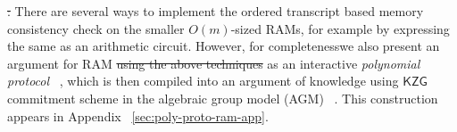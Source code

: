 \documentclass[sigconf]{acmart}
\newcommand{\kzg}{\ensuremath{\mathsf{KZG}}}
\newcommand{\moumita}[1]{\textcolor{orange}{M: #1}}
\providecommand{\DIFaddtex}[1]{{\protect\color{blue}\uwave{#1}}} %
\providecommand{\DIFdeltex}[1]{{\protect\color{red}\sout{#1}}}                      %
\providecommand{\DIFaddbegin}{} %
\providecommand{\DIFaddend}{} %
\providecommand{\DIFdelbegin}{} %
\providecommand{\DIFdelend}{} %
\providecommand{\DIFadd}[1]{\texorpdfstring{\DIFaddtex{#1}}{#1}} %
\providecommand{\DIFdel}[1]{\texorpdfstring{\DIFdeltex{#1}}{}} %
\newcommand{\DIFscaledelfig}{0.5}
\newlength{\DIFdelgraphicswidth} %
\newlength{\DIFdelgraphicsheight} %
\newcommand{\DIFaddincludegraphics}[2][]{{\color{blue}\fbox{\DIFOincludegraphics[#1]{#2}}}} %
\newcommand{\DIFdelincludegraphics}[2][]{%
	\sbox{\DIFdelgraphicsbox}{\DIFOincludegraphics[#1]{#2}}%
	\settoboxwidth{\DIFdelgraphicswidth}{\DIFdelgraphicsbox} %
	\settoboxtotalheight{\DIFdelgraphicsheight}{\DIFdelgraphicsbox} %
	\scalebox{\DIFscaledelfig}{%
		\parbox[b]{\DIFdelgraphicswidth}{\usebox{\DIFdelgraphicsbox}\\[-\baselineskip] \rule{\DIFdelgraphicswidth}{0em}}\llap{\resizebox{\DIFdelgraphicswidth}{\DIFdelgraphicsheight}{%
				\setlength{\unitlength}{\DIFdelgraphicswidth}%
				\begin{picture}(1,1)%
					\thicklines\linethickness{2pt} %
					{\color[rgb]{1,0,0}\put(0,0){\framebox(1,1){}}}%
					{\color[rgb]{1,0,0}\put(0,0){\line( 1,1){1}}}%
					{\color[rgb]{1,0,0}\put(0,1){\line(1,-1){1}}}%
				\end{picture}%
			}\hspace*{3pt}}} %
} %
\DeclareRobustCommand{\DIFaddbegin}{\DIFOaddbegin \let\includegraphics\DIFaddincludegraphics} %
\DeclareRobustCommand{\DIFaddend}{\DIFOaddend \let\includegraphics\DIFOincludegraphics} %
\DeclareRobustCommand{\DIFdelbegin}{\DIFOdelbegin \let\includegraphics\DIFdelincludegraphics} %
\DeclareRobustCommand{\DIFdelend}{\DIFOaddend \let\includegraphics\DIFOincludegraphics} %
\begin{document}
	
	\DIFdelbegin %
	\DIFdel{: }\DIFdelend \DIFaddbegin {} \DIFaddend There are several ways to implement the ordered transcript based
	memory consistency check on the smaller $O(m)$-sized RAMs, for example by expressing the same as an arithmetic
	circuit. However, for completeness\DIFaddbegin \DIFadd{, }\DIFaddend we also present an argument for RAM \DIFdelbegin \DIFdel{using the above techniques }\DIFdelend as an
	interactive {\em polynomial protocol} ~\cite{Gabizon2019PLONKPO}, which is then compiled into an argument of knowledge using \DIFaddbegin \DIFadd{the }\DIFaddend $\kzg$ ~\cite{AC:KatZavGol10}
	commitment scheme in the algebraic group model (AGM) ~\cite{C:FucKilLos18}. This construction appears in
	Appendix ~\ref{sec:poly-proto-ram-app}.
	\DIFdelbegin \DIFdel{
	}\DIFdelend %
	
\end{document}
